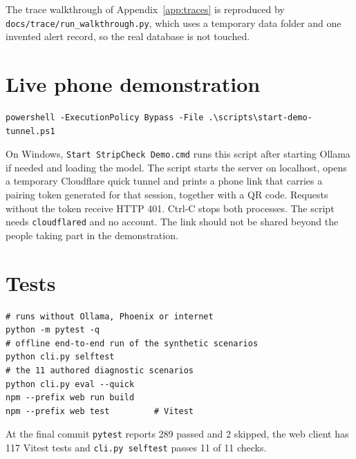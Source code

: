 \begin{sloppypar}The trace walkthrough of Appendix~\ref{app:traces} is reproduced by \texttt{docs/\allowbreak trace/\allowbreak run\_walkthrough.py}, which uses a temporary data folder and one invented alert record, so the real database is not touched.\end{sloppypar}

\section{Live phone demonstration}
\label{sec:app-run-tunnel}

\par\smallskip\noindent\begin{minipage}[t]{\linewidth}\vspace{-\topsep}\begin{lstlisting}[language={},numbers=none,breakatwhitespace=true]
powershell -ExecutionPolicy Bypass -File .\scripts\start-demo-tunnel.ps1
\end{lstlisting}\end{minipage}\par\smallskip\noindent
On Windows, \texttt{Start StripCheck Demo.cmd} runs this script after starting Ollama if needed and loading the model. The script starts the server on localhost, opens a temporary Cloudflare quick tunnel and prints a phone link that carries a pairing token generated for that session, together with a QR code. Requests without the token receive HTTP 401. Ctrl-C stops both processes. The script needs \texttt{cloudflared} and no account. The link should not be shared beyond the people taking part in the demonstration.

\section{Tests}
\label{sec:app-run-tests}

\par\smallskip\noindent\begin{minipage}[t]{\linewidth}\vspace{-\topsep}\begin{lstlisting}[language={},numbers=none,breakatwhitespace=true]
# runs without Ollama, Phoenix or internet
python -m pytest -q
# offline end-to-end run of the synthetic scenarios
python cli.py selftest
# the 11 authored diagnostic scenarios
python cli.py eval --quick
npm --prefix web run build
npm --prefix web test         # Vitest
\end{lstlisting}\end{minipage}\par\smallskip\noindent
At the final commit \texttt{pytest} reports 289 passed and 2 skipped, the web client has 117 Vitest tests and \texttt{cli.py selftest} passes 11 of 11 checks.

